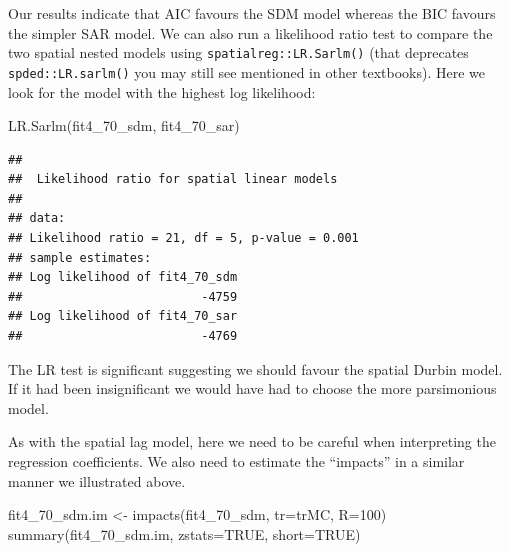 \documentclass[
  krantz2]{krantz}
\makeatletter
\newenvironment{Shaded}{\begin{snugshade}}{\end{snugshade}}
\newcommand{\AttributeTok}[1]{\textcolor[rgb]{0.61,0.61,0.61}{#1}}
\newcommand{\ConstantTok}[1]{\textcolor[rgb]{0,0,0}{#1}}
\newcommand{\DecValTok}[1]{\textcolor[rgb]{0.06,0.06,0.06}{#1}}
\newcommand{\FunctionTok}[1]{\textcolor[rgb]{0,0,0}{#1}}
\newcommand{\NormalTok}[1]{#1}
\newcommand{\OtherTok}[1]{\textcolor[rgb]{0.37,0.37,0.37}{#1}}
\newenvironment{kframe}{%
\medskip{}
\setlength{\fboxsep}{.8em}
 \def\at@end@of@kframe{}%
 \ifinner\ifhmode%
  \def\at@end@of@kframe{\end{minipage}}%
  \begin{minipage}{\columnwidth}%
 \fi\fi%
 \def\FrameCommand##1{\hskip\@totalleftmargin \hskip-\fboxsep
 \colorbox{shadecolor}{##1}\hskip-\fboxsep
     \hskip-\linewidth \hskip-\@totalleftmargin \hskip\columnwidth}%
 \MakeFramed {\advance\hsize-\width
   \@totalleftmargin\z@ \linewidth\hsize
   \@setminipage}}%
 {\par\unskip\endMakeFramed%
 \at@end@of@kframe}
\renewenvironment{Shaded}{\begin{kframe}}{\end{kframe}}
\makeatother
\begin{document}
Our results indicate that AIC favours the SDM model whereas the BIC favours the simpler SAR model. We can also run a likelihood ratio test to compare the two spatial nested models using \texttt{spatialreg::LR.Sarlm()} (that deprecates \texttt{spded::LR.sarlm()} you may still see mentioned in other textbooks). Here we look for the model with the highest log likelihood:

\begin{Shaded}
\begin{Highlighting}[]
\FunctionTok{LR.Sarlm}\NormalTok{(fit4\_70\_sdm, fit4\_70\_sar)}
\end{Highlighting}
\end{Shaded}

\begin{verbatim}
## 
##  Likelihood ratio for spatial linear models
## 
## data:  
## Likelihood ratio = 21, df = 5, p-value = 0.001
## sample estimates:
## Log likelihood of fit4_70_sdm 
##                         -4759 
## Log likelihood of fit4_70_sar 
##                         -4769
\end{verbatim}

The LR test is significant suggesting we should favour the spatial Durbin model. If it had been insignificant we would have had to choose the more parsimonious model.

As with the spatial lag model, here we need to be careful when interpreting the regression coefficients. We also need to estimate the ``impacts'' in a similar manner we illustrated above.

\begin{Shaded}
\begin{Highlighting}[]
\NormalTok{fit4\_70\_sdm.im }\OtherTok{\textless{}{-}} \FunctionTok{impacts}\NormalTok{(fit4\_70\_sdm, }\AttributeTok{tr=}\NormalTok{trMC, }\AttributeTok{R=}\DecValTok{100}\NormalTok{)}
\FunctionTok{summary}\NormalTok{(fit4\_70\_sdm.im, }\AttributeTok{zstats=}\ConstantTok{TRUE}\NormalTok{, }\AttributeTok{short=}\ConstantTok{TRUE}\NormalTok{)}
\end{Highlighting}
\end{Shaded}
\end{document}
